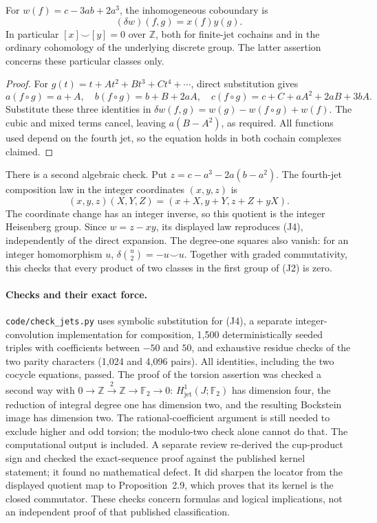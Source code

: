 \begin{proposition}\ours{}
For \(w(f)=c-3ab+2a^3\), the inhomogeneous coboundary is
\[
 (\delta w)(f,g)=x(f)y(g).                  \tag{J4}
\]
In particular \([x]\smile[y]=0\) over \(\mathbb Z\), both for finite-jet
cochains and in the ordinary cohomology of the underlying discrete group.
The latter assertion concerns these particular classes only.
\end{proposition}
\begin{proof}
For \(g(t)=t+At^2+Bt^3+Ct^4+\cdots\), direct substitution gives
\[
 a(f\circ g)=a+A,\quad
 b(f\circ g)=b+B+2aA,\quad
 c(f\circ g)=c+C+aA^2+2aB+3bA.
\]
Substitute these three identities in
\(\delta w(f,g)=w(g)-w(f\circ g)+w(f)\).
The cubic and mixed terms cancel, leaving \(a(B-A^2)\), as required.
All functions used depend on the fourth jet, so the equation holds in
both cochain complexes claimed.
\end{proof}

There is a second algebraic check. Put
\(z=c-a^3-2a(b-a^2)\). The fourth-jet composition law in the integer
coordinates \((x,y,z)\) is
\[
 (x,y,z)(X,Y,Z)=(x+X,y+Y,z+Z+yX).
\]
The coordinate change has an integer inverse, so this quotient is the
integer Heisenberg group. Since \(w=z-xy\), its displayed law reproduces
(J4), independently of the direct expansion. The degree-one squares also
vanish: for an integer homomorphism \(u\),
\(\delta\binom{u}{2}=-u\smile u\). Together with graded commutativity,
this checks that every product of two classes in the first group of (J2)
is zero.

\paragraph{Checks and their exact force.}
\texttt{code/check\_jets.py} uses symbolic substitution for (J4), a separate
integer-convolution implementation for composition, 1,500 deterministically
seeded triples with coefficients between \(-50\) and \(50\), and exhaustive
residue checks of the two parity characters (1,024 and 4,096 pairs).
All identities, including the two cocycle equations, passed. The proof of
the torsion assertion was checked a second way with
\(0\to\mathbb Z\xrightarrow{\,2\,}\mathbb Z\to\mathbb F_2\to0\):
\(H^1_{\mathrm{jet}}(J;\mathbb F_2)\) has dimension four, the reduction of
integral degree one has dimension two, and the resulting Bockstein image
has dimension two. The rational-coefficient argument is still needed to
exclude higher and odd torsion; the modulo-two check alone cannot do that.
The computational output is included. A separate review re-derived the
cup-product sign and checked the exact-sequence proof against the published
kernel statement; it found no mathematical defect. It did sharpen the
locator from the displayed quotient map to Proposition~2.9, which proves
that its kernel is the closed commutator. These checks concern formulas and
logical implications, not an independent proof of that published classification.

